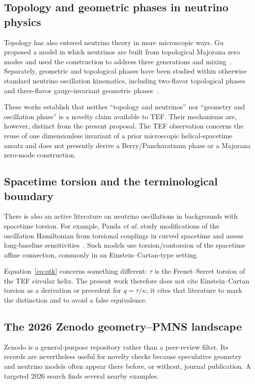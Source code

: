 \documentclass[10pt,twocolumn]{article}
\begin{document}
\subsection{Topology and geometric phases in neutrino physics}

Topology has also entered neutrino theory in more microscopic ways.  Gu proposed a
model in which neutrinos are built from topological Majorana zero modes and used the
construction to address three generations and mixing~\cite{Gu2014}.  Separately,
geometric and topological phases have been studied within otherwise standard
neutrino oscillation kinematics, including two-flavor topological phases and
three-flavor gauge-invariant geometric phases~\cite{Mehta2009,Manosh2022}.

These works establish that neither ``topology and neutrinos'' nor ``geometry and
oscillation phase'' is a novelty claim available to TEF.  Their mechanisms are,
however, distinct from the present proposal.  The TEF observation concerns the
reuse of one dimensionless invariant of a prior microscopic helical-spacetime
ansatz and does not presently derive a Berry/Pancharatnam phase or a Majorana
zero-mode construction.

\subsection{Spacetime torsion and the terminological boundary}

There is also an active literature on neutrino oscillations in backgrounds with
spacetime torsion.  For example, Panda \emph{et al.} study modifications of the
oscillation Hamiltonian from torsional couplings in curved spacetime and assess
long-baseline sensitivities~\cite{Panda2024}.  Such models use torsion/contorsion of
the spacetime affine connection, commonly in an Einstein--Cartan-type setting.

Equation~\eqref{eq:qtk} concerns something different: $\tau$ is the Frenet--Serret
torsion of the TEF circular helix.  The present work therefore does not cite
Einstein--Cartan torsion as a derivation or precedent for $q=\tau/\kappa$; it cites
that literature to mark the distinction and to avoid a false equivalence.

\subsection{The 2026 Zenodo geometry--PMNS landscape}

Zenodo is a general-purpose repository rather than a peer-review filter.  Its
records are nevertheless useful for novelty checks because speculative geometry
and neutrino models often appear there before, or without, journal publication.
A targeted 2026 search finds several nearby examples.
\end{document}
